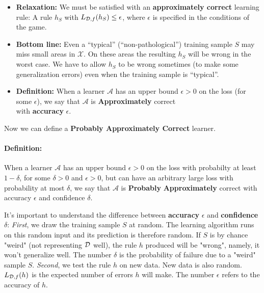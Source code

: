 \documentclass[11pt]{article}
\newcommand{\Ac}{\mathcal{A}}
\newcommand{\Xc}{\mathcal{X}}
\begin{document}
{\begin{itemize}
    no learner can hope to produce a perfect rule ( a rule $h_S$ with
      $L_{\D,f}(h_S) =
    0$) with probability at least $1-\delta$ regardless of  Nature's strategy.
\item {\bf Relaxation:} We must be satisfied with an {\bf approximately correct}
  learning rule: A rule $h_S$ with $L_{\mathcal{D},f}(h_S) \le
  \epsilon$, where $\epsilon$ is specified in the conditions of the game.
\item {\bf Bottom line:} Even a ``typical'' (``non-pathological'') training sample $S$ may miss small areas in $\Xc$. On these areas
  the resulting $h_S$ will be wrong in the worst case. We have to allow $h_S$ to
  be wrong sometimes (to make some generalization errors) even when the training sample is ``typical''.
\item {\bf Definition:}  When a learner $\Ac$ has an upper bound $\epsilon>0$ on
  the loss (for some $\epsilon$), we  say that $\Ac$ is {\bf Approximately}
  correct \\with {\bf accuracy} $\epsilon$.
\end{itemize}




Now we can define a {\bf Probably Approximately Correct} learner.
  \paragraph{Definition:}
    When a learner $\Ac$ has an upper bound $\epsilon>0$ on the loss with
    probabilty at least $1-\delta$, for some $\delta>0$ and $\epsilon>0$, 
    but can have an arbitrary large loss with probability at most
  $\delta$, we say that $\Ac$ is {\bf Probably} {\bf Approximately} correct with accuracy $\epsilon$ and confidence $\delta$.



It's important to understand the difference between \textbf{accuracy} $\epsilon$ and \textbf{confidence} $\delta$:
\textit{First}, we draw the training sample $S$ at random. The learning algorithm runs on this random input and its prediction is therefore random.
If $S$ is by chance "weird" (not representing $\mathcal{D}$ well), the rule $h$ produced will be "wrong", namely, it won't generalize well. The number $\delta$ is the probability of failure due to a "weird" sample $S$.
\textit{Second}, we test the rule $h$ on new data. New data is also random. $L_{\mathcal{D},f}(h)$ is the expected number of errors $h$ will make. The number $\epsilon$ refers to the accuracy of $h$.

}
\end{document}
